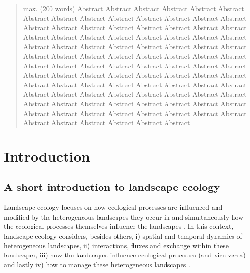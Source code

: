 \documentclass[smallextended]{svjour3}       %
\begin{document}
\begin{abstract}
max. (200 words) Abstract Abstract Abstract Abstract Abstract Abstract
Abstract Abstract Abstract Abstract Abstract Abstract Abstract Abstract
Abstract Abstract Abstract Abstract Abstract Abstract Abstract Abstract
Abstract Abstract Abstract Abstract Abstract Abstract Abstract Abstract
Abstract Abstract Abstract Abstract Abstract Abstract Abstract Abstract
Abstract Abstract Abstract Abstract Abstract Abstract Abstract Abstract
Abstract Abstract Abstract Abstract Abstract Abstract Abstract Abstract
Abstract Abstract Abstract Abstract Abstract Abstract Abstract Abstract
Abstract Abstract Abstract Abstract Abstract Abstract Abstract Abstract
Abstract Abstract Abstract Abstract Abstract Abstract Abstract Abstract
Abstract Abstract Abstract Abstract Abstract Abstract Abstract Abstract
Abstract Abstract Abstract Abstract Abstract Abstract Abstract Abstract
Abstract Abstract Abstract Abstract Abstract Abstract
\\


\end{abstract}


\def\spacingset#1{\renewcommand{\baselinestretch}%
{#1}\small\normalsize} \spacingset{1}


\hypertarget{sec:intro}{%
\section{Introduction}\label{sec:intro}}

\hypertarget{sec:landscape_ecology}{%
\subsection{A short introduction to landscape
ecology}\label{sec:landscape_ecology}}

Landscape ecology focuses on how ecological processes are influenced and
modified by the heterogeneous landscapes they occur in and
simultaneously how the ecological processes themselves influence the
landscapes \cite{Turner1989,Turner2005,With2019}. In this context,
landscape ecology considers, besides others, i) spatial and temporal
dynamics of heterogeneous landscapes, ii) interactions, fluxes and
exchange within these landscapes, iii) how the landscapes influence
ecological processes (and vice versa) and lastly iv) how to manage these
heterogeneous landscapes \cite{Risser1984,Turner1989}.
\end{document}
